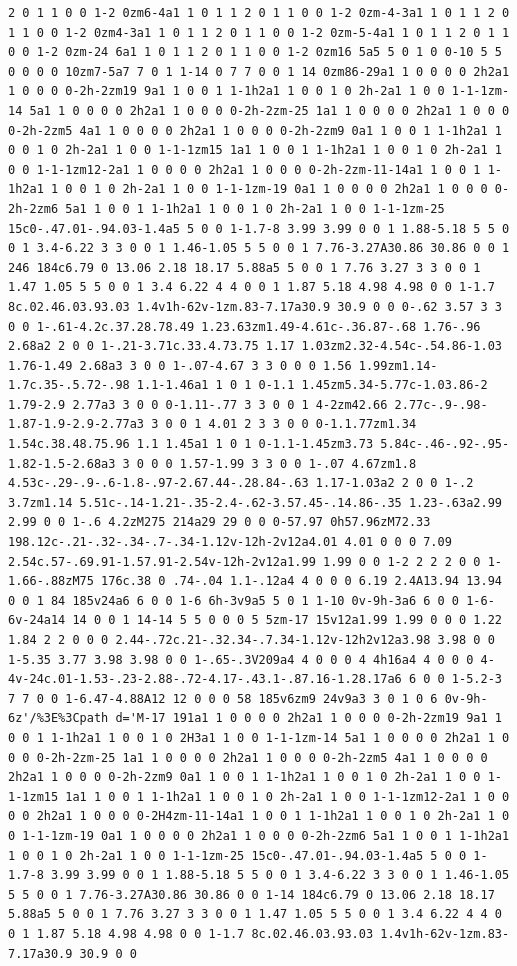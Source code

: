 \documentclass[11pt]{article}
\begin{document}
\begin{enumerate}
\begin{verbatim}
2 0 1 1 0 0 1-2 0zm6-4a1 1 0 1 1 2 0 1 1 0 0 1-2 0zm-4-3a1 1 0 1 1 2 0 1 1 0 0 1-2 0zm4-3a1 1 0 1 1 2 0 1 1 0 0 1-2 0zm-5-4a1 1 0 1 1 2 0 1 1 0 0 1-2 0zm-24 6a1 1 0 1 1 2 0 1 1 0 0 1-2 0zm16 5a5 5 0 1 0 0-10 5 5 0 0 0 0 10zm7-5a7 7 0 1 1-14 0 7 7 0 0 1 14 0zm86-29a1 1 0 0 0 0 2h2a1 1 0 0 0 0-2h-2zm19 9a1 1 0 0 1 1-1h2a1 1 0 0 1 0 2h-2a1 1 0 0 1-1-1zm-14 5a1 1 0 0 0 0 2h2a1 1 0 0 0 0-2h-2zm-25 1a1 1 0 0 0 0 2h2a1 1 0 0 0 0-2h-2zm5 4a1 1 0 0 0 0 2h2a1 1 0 0 0 0-2h-2zm9 0a1 1 0 0 1 1-1h2a1 1 0 0 1 0 2h-2a1 1 0 0 1-1-1zm15 1a1 1 0 0 1 1-1h2a1 1 0 0 1 0 2h-2a1 1 0 0 1-1-1zm12-2a1 1 0 0 0 0 2h2a1 1 0 0 0 0-2h-2zm-11-14a1 1 0 0 1 1-1h2a1 1 0 0 1 0 2h-2a1 1 0 0 1-1-1zm-19 0a1 1 0 0 0 0 2h2a1 1 0 0 0 0-2h-2zm6 5a1 1 0 0 1 1-1h2a1 1 0 0 1 0 2h-2a1 1 0 0 1-1-1zm-25 15c0-.47.01-.94.03-1.4a5 5 0 0 1-1.7-8 3.99 3.99 0 0 1 1.88-5.18 5 5 0 0 1 3.4-6.22 3 3 0 0 1 1.46-1.05 5 5 0 0 1 7.76-3.27A30.86 30.86 0 0 1 246 184c6.79 0 13.06 2.18 18.17 5.88a5 5 0 0 1 7.76 3.27 3 3 0 0 1 1.47 1.05 5 5 0 0 1 3.4 6.22 4 4 0 0 1 1.87 5.18 4.98 4.98 0 0 1-1.7 8c.02.46.03.93.03 1.4v1h-62v-1zm.83-7.17a30.9 30.9 0 0 0-.62 3.57 3 3 0 0 1-.61-4.2c.37.28.78.49 1.23.63zm1.49-4.61c-.36.87-.68 1.76-.96 2.68a2 2 0 0 1-.21-3.71c.33.4.73.75 1.17 1.03zm2.32-4.54c-.54.86-1.03 1.76-1.49 2.68a3 3 0 0 1-.07-4.67 3 3 0 0 0 1.56 1.99zm1.14-1.7c.35-.5.72-.98 1.1-1.46a1 1 0 1 0-1.1 1.45zm5.34-5.77c-1.03.86-2 1.79-2.9 2.77a3 3 0 0 0-1.11-.77 3 3 0 0 1 4-2zm42.66 2.77c-.9-.98-1.87-1.9-2.9-2.77a3 3 0 0 1 4.01 2 3 3 0 0 0-1.1.77zm1.34 1.54c.38.48.75.96 1.1 1.45a1 1 0 1 0-1.1-1.45zm3.73 5.84c-.46-.92-.95-1.82-1.5-2.68a3 3 0 0 0 1.57-1.99 3 3 0 0 1-.07 4.67zm1.8 4.53c-.29-.9-.6-1.8-.97-2.67.44-.28.84-.63 1.17-1.03a2 2 0 0 1-.2 3.7zm1.14 5.51c-.14-1.21-.35-2.4-.62-3.57.45-.14.86-.35 1.23-.63a2.99 2.99 0 0 1-.6 4.2zM275 214a29 29 0 0 0-57.97 0h57.96zM72.33 198.12c-.21-.32-.34-.7-.34-1.12v-12h-2v12a4.01 4.01 0 0 0 7.09 2.54c.57-.69.91-1.57.91-2.54v-12h-2v12a1.99 1.99 0 0 1-2 2 2 2 0 0 1-1.66-.88zM75 176c.38 0 .74-.04 1.1-.12a4 4 0 0 0 6.19 2.4A13.94 13.94 0 0 1 84 185v24a6 6 0 0 1-6 6h-3v9a5 5 0 1 1-10 0v-9h-3a6 6 0 0 1-6-6v-24a14 14 0 0 1 14-14 5 5 0 0 0 5 5zm-17 15v12a1.99 1.99 0 0 0 1.22 1.84 2 2 0 0 0 2.44-.72c.21-.32.34-.7.34-1.12v-12h2v12a3.98 3.98 0 0 1-5.35 3.77 3.98 3.98 0 0 1-.65-.3V209a4 4 0 0 0 4 4h16a4 4 0 0 0 4-4v-24c.01-1.53-.23-2.88-.72-4.17-.43.1-.87.16-1.28.17a6 6 0 0 1-5.2-3 7 7 0 0 1-6.47-4.88A12 12 0 0 0 58 185v6zm9 24v9a3 3 0 1 0 6 0v-9h-6z'/%3E%3Cpath d='M-17 191a1 1 0 0 0 0 2h2a1 1 0 0 0 0-2h-2zm19 9a1 1 0 0 1 1-1h2a1 1 0 0 1 0 2H3a1 1 0 0 1-1-1zm-14 5a1 1 0 0 0 0 2h2a1 1 0 0 0 0-2h-2zm-25 1a1 1 0 0 0 0 2h2a1 1 0 0 0 0-2h-2zm5 4a1 1 0 0 0 0 2h2a1 1 0 0 0 0-2h-2zm9 0a1 1 0 0 1 1-1h2a1 1 0 0 1 0 2h-2a1 1 0 0 1-1-1zm15 1a1 1 0 0 1 1-1h2a1 1 0 0 1 0 2h-2a1 1 0 0 1-1-1zm12-2a1 1 0 0 0 0 2h2a1 1 0 0 0 0-2H4zm-11-14a1 1 0 0 1 1-1h2a1 1 0 0 1 0 2h-2a1 1 0 0 1-1-1zm-19 0a1 1 0 0 0 0 2h2a1 1 0 0 0 0-2h-2zm6 5a1 1 0 0 1 1-1h2a1 1 0 0 1 0 2h-2a1 1 0 0 1-1-1zm-25 15c0-.47.01-.94.03-1.4a5 5 0 0 1-1.7-8 3.99 3.99 0 0 1 1.88-5.18 5 5 0 0 1 3.4-6.22 3 3 0 0 1 1.46-1.05 5 5 0 0 1 7.76-3.27A30.86 30.86 0 0 1-14 184c6.79 0 13.06 2.18 18.17 5.88a5 5 0 0 1 7.76 3.27 3 3 0 0 1 1.47 1.05 5 5 0 0 1 3.4 6.22 4 4 0 0 1 1.87 5.18 4.98 4.98 0 0 1-1.7 8c.02.46.03.93.03 1.4v1h-62v-1zm.83-7.17a30.9 30.9 0 0 
\end{verbatim}
\end{enumerate}
\end{document}
